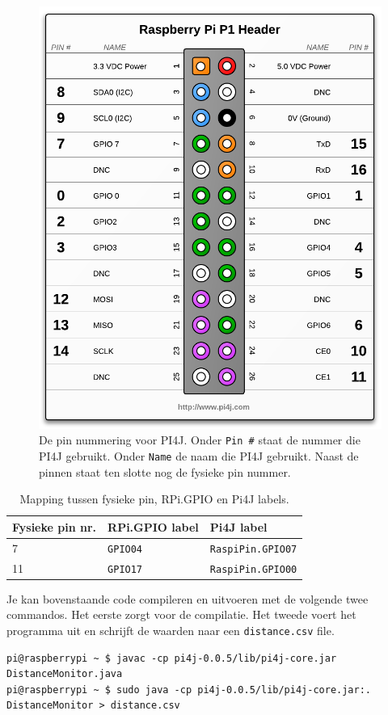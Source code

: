 \documentclass[a4paper]{article}
\begin{document}
\begin{figure}[h!]
  \centering
  \includegraphics[width=.5\textwidth]{images/gpio-pi4j.png}
  \caption{De pin nummering voor PI4J.  Onder \texttt{Pin \#} staat de
nummer die PI4J gebruikt.  Onder \texttt{Name} de naam die PI4J
gebruikt.  Naast de pinnen staat ten slotte nog de fysieke pin
nummer.}
  \label{fig:pi4j}
\end{figure}

\begin{table}[h!]
  \centering
  \begin{tabular}{l|ll}
    \hline
    \textbf{Fysieke pin nr.} & \textbf{RPi.GPIO label} & \textbf{Pi4J label} \\
    \hline
    7 & \texttt{GPIO04} & \texttt{RaspiPin.GPIO07} \\
    11 & \texttt{GPIO17} & \texttt{RaspiPin.GPIO00} \\
    \hline
  \end{tabular}
  \caption{Mapping tussen fysieke pin, RPi.GPIO en Pi4J labels.}
  \label{table:mapping}
\end{table}



  Je kan bovenstaande code compileren en uitvoeren met de volgende
twee commandos.  Het eerste zorgt voor de compilatie.  Het tweede
voert het programma uit en schrijft de waarden naar een
\texttt{distance.csv} file.
\lstset{basicstyle=\footnotesize\ttfamily}
\begin{lstlisting}
pi@raspberrypi ~ $ javac -cp pi4j-0.0.5/lib/pi4j-core.jar DistanceMonitor.java
pi@raspberrypi ~ $ sudo java -cp pi4j-0.0.5/lib/pi4j-core.jar:. DistanceMonitor > distance.csv
\end{lstlisting}
\end{document}
